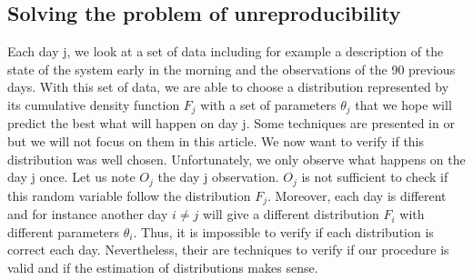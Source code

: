 \documentclass{article}
\begin{document}
 \subsection{Solving the problem of unreproducibility}
	Each day j, we look at a set of data including for example a description of the state of the system early in the morning and the observations of the 90 previous days. With this set of data, we are able to choose a distribution represented by its cumulative density function \begin{math}F_j\end{math} with a set of parameters \begin{math} \theta_j \end{math} that we hope will predict the best what will happen on day j. Some techniques are presented in \cite{vineconstruction} or \cite{fourcopulas} but we will not focus on them in this article. We now want to verify if this distribution was well chosen. \newline
	\newline
   Unfortunately, we only observe what happens on the day j once. Let us note \begin{math}O_j \end{math} the day j observation. \begin{math}O_j \end{math} is not sufficient to check if this random variable follow the distribution \begin{math} F_j \end{math}. Moreover, each day is different and for instance another day \begin{math}i\neq j\end{math}  will give a different distribution \begin{math} F_i \end{math} with different parameters \begin{math} \theta_i \end{math}. Thus, it is impossible to verify if each distribution is correct each day. Nevertheless, their are techniques to verify if our procedure is valid and if the estimation of distributions makes sense. \newline
   \newline
   
\end{document}
